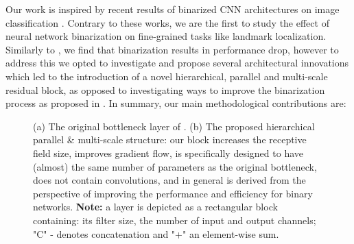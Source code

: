 \documentclass[10pt,journal,compsoc]{IEEEtran}
\begin{document}
Our work is inspired by recent results of binarized CNN architectures on image classification \cite{rastegari2016xnor, courbariaux2016binarized}. Contrary to these works, we are the first to study the effect of neural network binarization on fine-grained tasks like landmark localization. Similarly to \cite{rastegari2016xnor, courbariaux2016binarized}, we find that binarization results in performance drop, however to address this we opted to investigate and propose several architectural innovations which led to the introduction of a novel hierarchical, parallel and multi-scale residual block, as opposed to investigating ways to improve the binarization process as proposed in \cite{rastegari2016xnor, courbariaux2016binarized}.  In summary, our main methodological contributions are:
\begin{figure}[!htb]
    \centering

    \caption{ (a) The original bottleneck layer of \cite{he2016identity}. (b) The proposed hierarchical parallel \& multi-scale structure: our block increases the receptive field size, improves gradient flow, is specifically designed to have (almost) the same number of parameters as the original bottleneck, does not contain  convolutions, and in general is derived from the perspective of improving the performance and efficiency for binary networks. \textbf{Note:} a layer is depicted as a rectangular block containing: its filter size, the number of input and output channels; "C" - denotes concatenation and "+" an element-wise sum.}
    \label{fig:intro_layers}
\end{figure}
\end{document}
